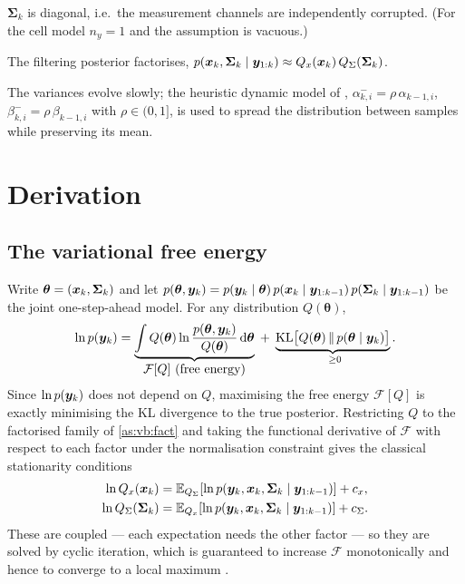 \begin{assumption}\label{as:vb:diag}
$\bm{\Sigma}_k$ is diagonal, i.e.\ the measurement channels are independently corrupted.  (For the
cell model $n_y=1$ and the assumption is vacuous.)
\end{assumption}
\begin{assumption}\label{as:vb:fact}
The filtering posterior factorises, $p(\bm{x}_k,\bm{\Sigma}_k\mid \bm{y}_{1:k})\approx
Q_x(\bm{x}_k)\,Q_\Sigma(\bm{\Sigma}_k)$.
\end{assumption}
\begin{assumption}\label{as:vb:dyn}
The variances evolve slowly; the heuristic dynamic model of \cite[Sec.~III]{sarkka2009vb},
$\alpha^-_{k,i}=\rho\,\alpha_{k-1,i}$, $\beta^-_{k,i}=\rho\,\beta_{k-1,i}$ with $\rho\in(0,1]$, is
used to spread the distribution between samples while preserving its mean.
\end{assumption}

\section{Derivation}

\subsection{The variational free energy}
Write $\bm\theta = (\bm{x}_k,\bm\Sigma_k)$ and let $p(\bm\theta,\bm{y}_k) = p(\bm{y}_k\mid\bm\theta)\,
p(\bm{x}_k\mid\bm{y}_{1:k-1})\,p(\bm\Sigma_k\mid\bm{y}_{1:k-1})$ be the joint one-step-ahead model.  For any
distribution $Q(\bm\theta)$,
\begin{equation}
\ln p(\vy_k) = \underbrace{\int Q(\bm\theta)\ln\frac{p(\bm\theta,\vy_k)}{Q(\bm\theta)}\,\mathrm{d}\bm\theta}_{\textstyle \mathcal{F}[Q]\ \text{(free energy)}}
\;+\; \underbrace{\mathrm{KL}\big[Q(\bm\theta)\,\|\,p(\bm\theta\mid\vy_k)\big]}_{\ \ge 0}.
\label{eq:vb:fe}
\end{equation}
Since $\ln p(\bm{y}_k)$ does not depend on $Q$, maximising the free energy $\mathcal{F}[Q]$ is exactly
minimising the KL divergence to the true posterior.  Restricting $Q$ to the factorised family of
\cref{as:vb:fact} and taking the functional derivative of $\mathcal{F}$ with respect to each factor
under the normalisation constraint gives the classical stationarity conditions
\cite[Sec.~10.1]{bishop2006prml}
\begin{align}
\ln Q_x(\bm{x}_k) &= \mathbb{E}_{Q_\Sigma}\!\left[\ln p(\bm{y}_k,\bm{x}_k,\bm\Sigma_k\mid \bm{y}_{1:k-1})\right] + c_x,
\label{eq:vb:qx}\\
\ln Q_\Sigma(\bm\Sigma_k) &= \mathbb{E}_{Q_x}\!\left[\ln p(\bm{y}_k,\bm{x}_k,\bm\Sigma_k\mid \bm{y}_{1:k-1})\right] + c_\Sigma.
\label{eq:vb:qs}
\end{align}
These are coupled --- each expectation needs the other factor --- so they are solved by cyclic
iteration, which is guaranteed to increase $\mathcal{F}$ monotonically and hence to converge to a
local maximum \cite[Sec.~10.1.1]{bishop2006prml}.

